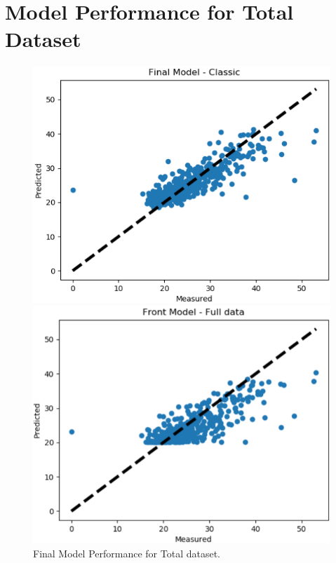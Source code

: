 \documentclass[conference]{IEEEtran}
\begin{document}
\section{Model Performance for Total Dataset}

\begin{figure}[H]
    \centering
    \begin{minipage}[b]{0.25\textwidth}
        \includegraphics[width=\linewidth]{compscatter.png}
        \caption{Final Model Performance for Total dataset.}
        \label{fig:compscatter}
        \end{minipage}
        \hspace{1cm}
    \begin{minipage}[b]{0.25\textwidth}
    \includegraphics[width=\linewidth]{frontscatter.png}

\end{minipage}
\end{figure}
\end{document}
